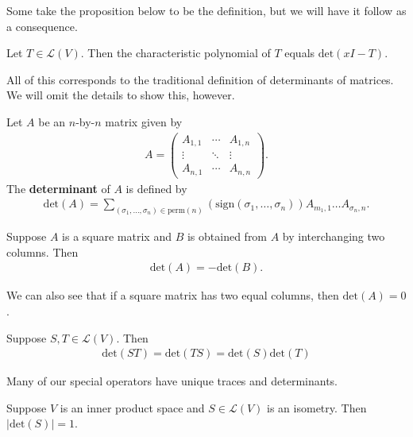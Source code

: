 \documentclass{memoir}
\begin{document}
Some take the proposition below to be the definition, but we will have it follow as a consequence.
\begin{prop}
	Let \(T \in \mathcal{L}(V)\). Then the characteristic polynomial of \(T\) equals \(\textrm{det}(xI-T)\).
\end{prop}

All of this corresponds to the traditional definition of determinants of matrices. We will omit the details to show this, however.

\begin{defn}
	Let \(A\) be an \(n\)-by-\(n\) matrix given by
	\begin{align*}
		A = \begin{pmatrix} A_{1,1} & \cdots & A_{1,n}\\
		\vdots & \ddots & \vdots \\
	A_{n,1} & \cdots & A_{n,n}\end{pmatrix} .
	\end{align*}
	The \textbf{determinant} of \(A\) is defined by
	\begin{align*}
		\textrm{det}(A) = \sum_{(\sigma_1,\ldots,\sigma_n) \in \textrm{perm}(n)} \left( \textrm{sign}(\sigma_1,\ldots,\sigma_n) \right) A_{m_1,1}\ldots A_{\sigma_n, n}.
	\end{align*}
\end{defn}

\begin{prop}
	Suppose \(A\) is a square matrix and \(B\) is obtained from \(A\) by interchanging two columns. Then
	\begin{align*}
		\textrm{det}(A) = -\textrm{det}(B).
	\end{align*}
\end{prop}
We can also see that if a square matrix has two equal columns, then \(\textrm{det}(A) = 0\).

\begin{prop}
	Suppose \(S,T \in \mathcal{L}(V)\). Then
	\begin{align*}
		\textrm{det}(ST) = \textrm{det}(TS) = \textrm{det}(S) \textrm{det}(T)
	\end{align*}
\end{prop}

Many of our special operators have unique traces and determinants.

\begin{prop}
	Suppose \(V\) is an inner product space and \(S \in \mathcal{L}(V)\) is an isometry. Then \(\left| \textrm{det}(S) \right|=1\).
\end{prop}
\end{document}
